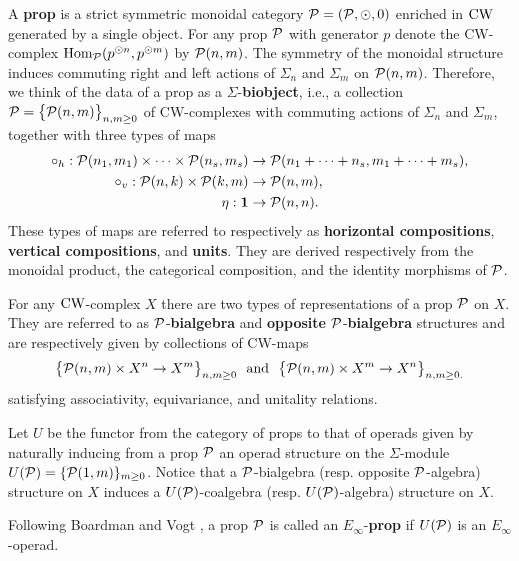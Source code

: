 A \textbf{prop} is a strict symmetric monoidal category $\P = (\P, \odot, 0)$ enriched in $\CW$ generated by a single object. For any prop $\P$ with generator $p$ denote the CW-complex $\Hom_\P(p^{\odot n}, p^{\odot m})$ by $\P(n,m)$. The symmetry of the monoidal structure induces commuting right and left actions of $\Sigma_n$ and $\Sigma_m$ on $\P(n,m)$. Therefore, we think of the data of a prop as a $\Sigma$-\textbf{biobject}, i.e., a collection $\P = \big\{\P(n,m)\big\}_{n,m\geq0}$ of CW-complexes with commuting actions of $\Sigma_n$ and $\Sigma_m$, together with three types of maps
\begin{align*}
\circ_h : \P(n_1,m_1) \times \cdots \times \P(n_s,m_s) &\to \P(n_1+\cdots+n_s, m_1+\cdots+m_s), \\
\circ_v : \P(n,k) \times \P(k,m) &\to \P(n,m), \\
\eta : \1 &\to \P(n,n).
\end{align*}
These types of maps are referred to respectively as \textbf{horizontal compositions}, \textbf{vertical compositions}, and \textbf{units}. They are derived respectively from the monoidal product, the categorical composition, and the identity morphisms of $\P$. 

For any $\CW$-complex $X$ there are two types of representations of a prop $\P$ on $X$. They are referred to as $\P$-\textbf{bialgebra} and \textbf{opposite} $\P$-\textbf{bialgebra} structures and are respectively given by collections of CW-maps 
\begin{equation*}
\big\{ \P(n,m) \times X^n \to X^m \big\}_{n,m \geq 0} \text{\ \ and \ } \big\{ \P(n,m) \times X^m \to X^n \big\}_{n,m \geq 0.}
\end{equation*}
satisfying associativity, equivariance, and unitality relations.

Let $U$ be the functor from the category of props to that of operads given by naturally inducing from a prop $\P$ an operad structure on the $\Sigma$-module $U(\P)=\{\P(1,m)\}_{m\geq0}$. Notice that a $\P$-bialgebra (resp. opposite $\P$-algebra) structure on $X$ induces a $U(\P)$-coalgebra (resp. $U(\P)$-algebra) structure on $X$.

Following Boardman and Vogt \cite{boardman2006homotopy}, a prop $\P$ is called an $E_\infty$-\textbf{prop} if $U(\P)$ is an $E_\infty$-operad.

